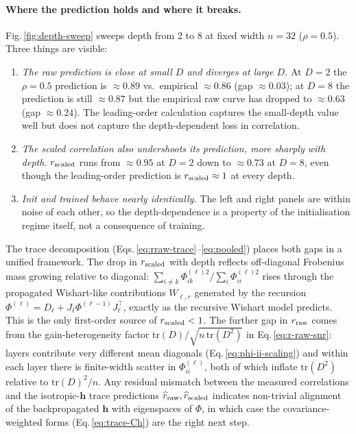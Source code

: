\documentclass[10pt]{article}
\newcommand{\vh}{\mathbf{h}}
\begin{document}
\paragraph{Where the prediction holds and where it breaks.}
Fig.\,\ref{fig:depth-sweep} sweeps depth from 2 to 8 at fixed width $n=32$ ($\rho=0.5$).  Three things are visible:
\begin{enumerate}
    \setlength\itemsep{0pt}
  \item \emph{The raw prediction is close at small $D$ and diverges at large $D$.}  At $D=2$ the $\rho=0.5$ prediction is $\approx 0.89$ vs.\ empirical $\approx 0.86$ (gap $\approx 0.03$); at $D=8$ the prediction is still $\approx 0.87$ but the empirical raw curve has dropped to $\approx 0.63$ (gap $\approx 0.24$).  The leading-order calculation captures the small-depth value well but does not capture the depth-dependent loss in correlation.
  \item \emph{The scaled correlation also undershoots its prediction, more sharply with depth.}  $r_{\rm scaled}$ runs from $\approx 0.95$ at $D=2$ down to $\approx 0.73$ at $D=8$, even though the leading-order prediction is $r_{\rm scaled}\approx 1$ at every depth.
  \item \emph{Init and trained behave nearly identically.}  The left and right panels are within noise of each other, so the depth-dependence is a property of the initialisation regime itself, not a consequence of training.
\end{enumerate}
The trace decomposition (Eqs.\,\ref{eq:rraw-trace}--\ref{eq:pooled}) places both gaps in a unified framework.  The drop in $r_{\rm scaled}$ with depth reflects off-diagonal Frobenius mass growing relative to diagonal: $\sum_{i\neq k}\Phi^{(\ell)2}_{ik}/\sum_i\Phi^{(\ell)2}_{ii}$ rises through the propagated Wishart-like contributions $W_{\ell,r}$ generated by the recursion $\Phi^{(\ell)}=D_\ell + J_\ell\Phi^{(\ell-1)}J_\ell^{\!\top}$, exactly as the recursive Wishart model predicts.  This is the only first-order source of $r_{\rm scaled}<1$.  The further gap in $r_{\rm raw}$ comes from the gain-heterogeneity factor $\mathrm{tr}(D)/\sqrt{n\,\mathrm{tr}(D^2)}$ in Eq.\,\ref{eq:r-raw-snr}: layers contribute very different mean diagonals (Eq.\,\ref{eq:phi-ii-scaling}) and within each layer there is finite-width scatter in $\Phi^{(\ell)}_{ii}$, both of which inflate $\mathrm{tr}(D^2)$ relative to $\mathrm{tr}(D)^2/n$.  Any residual mismatch between the measured correlations and the isotropic-$\vh$ trace predictions $\widehat r_{\rm raw},\widehat r_{\rm scaled}$ indicates non-trivial alignment of the backpropagated $\vh$ with eigenspaces of $\Phi$, in which case the covariance-weighted forms (Eq.\,\ref{eq:trace-Ch}) are the right next step.
\end{document}
